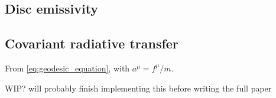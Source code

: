 \subsection{Disc emissivity}


\subsection{Covariant radiative transfer}
From \eqref{eq:geodesic_equation}, with $a^\mu = f^\mu / m$.

WIP? will probably finish implementing this before writing the full paper

